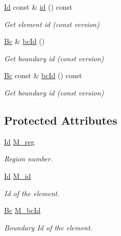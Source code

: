 \begin{DoxyCompactItemize}
\hyperlink{classTspeed_1_1Entity_a32da920d1e9397a793b67beadd70e8fe}{Id} const \& \hyperlink{classTspeed_1_1Entity_a38b1c806bcf12dfe99a66d343aff8004}{id} () const 
\begin{DoxyCompactList}\small\item\em Get element id (const version) \end{DoxyCompactList}\item 
\hyperlink{namespaceTspeed_a301e5218199485c06d62434c719ea5e0}{Bc} \& \hyperlink{classTspeed_1_1Entity_a986365e93ee83bb0b4706260ee1c9892}{bc\-Id} ()
\begin{DoxyCompactList}\small\item\em Get boundary id (const version) \end{DoxyCompactList}\item 
\hyperlink{namespaceTspeed_a301e5218199485c06d62434c719ea5e0}{Bc} const \& \hyperlink{classTspeed_1_1Entity_aab5641d64b52564729a9f55a24b9bb1b}{bc\-Id} () const 
\begin{DoxyCompactList}\small\item\em Get boundary id (const version) \end{DoxyCompactList}\end{DoxyCompactItemize}
\subsection*{Protected Attributes}
\begin{DoxyCompactItemize}
\item 
\hyperlink{classTspeed_1_1Entity_a32da920d1e9397a793b67beadd70e8fe}{Id} \hyperlink{classTspeed_1_1Entity_a4c553133417f2766bd5898d2fa558374}{M\-\_\-reg}
\begin{DoxyCompactList}\small\item\em Region number. \end{DoxyCompactList}\item 
\hyperlink{classTspeed_1_1Entity_a32da920d1e9397a793b67beadd70e8fe}{Id} \hyperlink{classTspeed_1_1Entity_a78689c259080e251d0e4ae01db20a7ba}{M\-\_\-id}
\begin{DoxyCompactList}\small\item\em Id of the element. \end{DoxyCompactList}\item 
\hyperlink{namespaceTspeed_a301e5218199485c06d62434c719ea5e0}{Bc} \hyperlink{classTspeed_1_1Entity_a768810bb9f657134eac0ba66a8e0d77b}{M\-\_\-bc\-Id}
\begin{DoxyCompactList}\small\item\em Boundary Id of the element. \end{DoxyCompactList}\end{DoxyCompactItemize}


